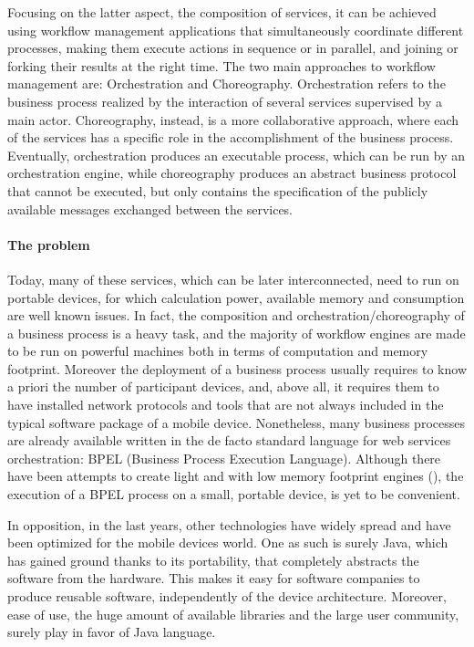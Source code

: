 Focusing on the latter aspect, the composition of services, it can be achieved using workflow management applications that simultaneously coordinate different processes, making them execute actions in sequence or in parallel, and joining or forking their results at the right time. %
The two main approaches to workflow management are: Orchestration and Choreography.
Orchestration refers to the %
business process realized by the interaction of several services supervised by a main actor. Choreography, instead, is a more collaborative approach, where each of the services has a specific role in the accomplishment of the business process. Eventually, orchestration produces an executable process, which can be run by an orchestration engine, while choreography produces an abstract business protocol that cannot be executed, but only contains the specification of the publicly available messages exchanged between the services.

\paragraph{The problem}
Today, many of these services, which can be later interconnected, need to run on portable devices, for which calculation power, available memory and consumption are well known issues. In fact, the composition and orchestration/choreography of a business process is a heavy task, and the majority of workflow engines are made to be run on powerful machines both in terms of computation and memory footprint. Moreover the deployment of a business process usually requires to know a priori the number of participant devices, and, above all, it requires them to have installed network protocols and tools that are not always included in the typical software package of a mobile device. 
Nonetheless, many business processes are already available written in the de facto standard language for web services orchestration: BPEL (Business Process Execution Language). Although there have been attempts to create light and with low memory footprint engines (\cite{bpelMobileEngineMora,bpelMobileEngineHackmann06sliver:a}), the execution of a BPEL process on a small, portable device, is yet to be convenient.

In opposition, in the last years, other technologies have widely spread and have been optimized for the mobile devices world. One as such is surely Java, which has gained ground thanks to its portability, that completely abstracts the software from the hardware. This makes it easy for software companies to produce reusable software, independently of the device architecture. Moreover, ease of use, the huge amount of available libraries and the large user community, surely play in favor of Java language. 

